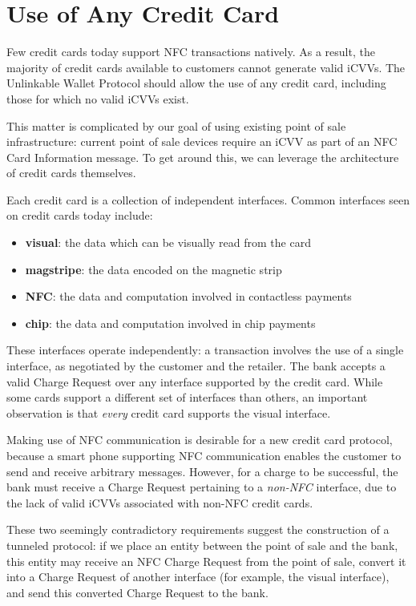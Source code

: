 \section{Use of Any Credit Card}
\label{sec:goals-anycard}

Few credit cards today support NFC transactions natively.
As a result, the majority of credit cards available to customers cannot generate valid iCVVs.
The Unlinkable Wallet Protocol should allow the use of any credit card, including those for which no valid iCVVs exist.

This matter is complicated by our goal of using existing point of sale infrastructure:
    current point of sale devices require an iCVV as part of an NFC Card Information message.
To get around this, we can leverage the architecture of credit cards themselves.

Each credit card is a collection of independent interfaces.
Common interfaces seen on credit cards today include:

\begin{itemize}
\item \textbf{visual}: the data which can be visually read from the card
\item \textbf{magstripe}: the data encoded on the magnetic strip
\item \textbf{NFC}: the data and computation involved in contactless payments
\item \textbf{chip}: the data and computation involved in chip payments
\end{itemize}

These interfaces operate independently:
    a transaction involves the use of a single interface, as negotiated by the customer and the retailer.
The bank accepts a valid Charge Request over any interface supported by the credit card.
While some cards support a different set of interfaces than others, an important observation is that \emph{every} credit card supports the visual interface.

Making use of NFC communication is desirable for a new credit card protocol,
    because a smart phone supporting NFC communication enables the customer to send and receive arbitrary messages.
However, for a charge to be successful, the bank must receive a Charge Request pertaining to a \emph{non-NFC} interface,
    due to the lack of valid iCVVs associated with non-NFC credit cards.

These two seemingly contradictory requirements suggest the construction of a tunneled protocol:
    if we place an entity between the point of sale and the bank, this entity may receive an NFC Charge Request from the point of sale,
    convert it into a Charge Request of another interface (for example, the visual interface),
    and send this converted Charge Request to the bank.
